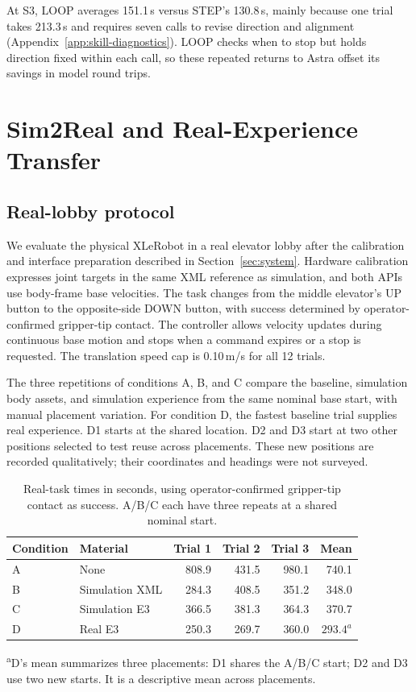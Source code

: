 \documentclass[11pt]{article}
\begin{document}
At S3, LOOP averages 151.1\,s versus STEP's 130.8\,s, mainly because one trial takes 213.3\,s and requires seven calls to revise direction and alignment (Appendix~\ref{app:skill-diagnostics}). LOOP checks when to stop but holds direction fixed within each call, so these repeated returns to Astra offset its savings in model round trips.

\section{Sim2Real and Real-Experience Transfer}
\subsection{Real-lobby protocol}\label{sec:real-protocol}
We evaluate the physical XLeRobot in a real elevator lobby after the calibration and interface preparation described in Section~\ref{sec:system}. Hardware calibration expresses joint targets in the same XML reference as simulation, and both APIs use body-frame base velocities. The task changes from the middle elevator's UP button to the opposite-side DOWN button, with success determined by operator-confirmed gripper-tip contact. The controller allows velocity updates during continuous base motion and stops when a command expires or a stop is requested. The translation speed cap is 0.10\,m/s for all 12 trials.

The three repetitions of conditions A, B, and C compare the baseline, simulation body assets, and simulation experience from the same nominal base start, with manual placement variation. For condition D, the fastest baseline trial supplies real experience. D1 starts at the shared location. D2 and D3 start at two other positions selected to test reuse across placements. These new positions are recorded qualitatively; their coordinates and headings were not surveyed.

\begin{table}[t]
\centering
\begin{tabular}{llrrrr}
\toprule
Condition & Material & Trial 1 & Trial 2 & Trial 3 & Mean\\\midrule
A & None & 808.9 & 431.5 & 980.1 & 740.1\\
B & Simulation XML & 284.3 & 408.5 & 351.2 & 348.0\\
C & Simulation E3 & 366.5 & 381.3 & 364.3 & 370.7\\
D & Real E3 & 250.3 & 269.7 & 360.0 & $293.4^{a}$\\\bottomrule
\end{tabular}
\par\vspace{3pt}
\begin{minipage}{.88\linewidth}\footnotesize
\textsuperscript{a}D's mean summarizes three placements: D1 shares the A/B/C start; D2 and D3 use two new starts. It is a descriptive mean across placements.
\end{minipage}
\caption{Real-task times in seconds, using operator-confirmed gripper-tip contact as success. A/B/C each have three repeats at a shared nominal start.}
\label{tab:real}
\end{table}
\end{document}
